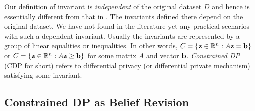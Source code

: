 \documentclass[11pt]{article}
\begin{document}
Our definition of invariant is \emph{independent} of the original dataset $D$ and hence is essentially different from that in \cite{GongM20}.  The invariants defined there depend on the original dataset.  We have not found  in the literature yet any practical scenarios with such a dependent invariant. 
Usually the invariants are represented by a group of linear equalities or inequalities. In other words,  $C= \{\bold{z}\in \mathbb{R}^n: A\bold{z} = \bold{b}\}$ or $C= \{\bold{z}\in \mathbb{R}^n: A \bold{z} \geq \bold{b}\}$ for some matrix $A$ and vector $\bold{b}$. \emph{Constrained DP} (CDP for short) refers to differential privacy (or differential private mechanism) satisfying some invariant. 

\subsection{Constrained DP as Belief Revision} 
\end{document}

